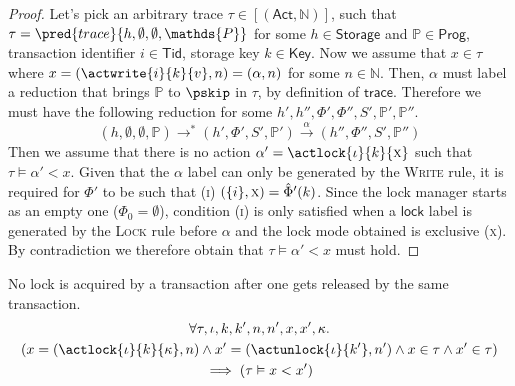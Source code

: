 \begin{proof}
Let's pick an arbitrary trace $\tau \in [(\mathsf{Act}, \mathds{N})]$, such that $\tau = \pred{trace}{h, \emptyset, \emptyset, \mathds{P}}$ for some $h \in \mathsf{Storage}$ and $\mathds{P} \in \mathsf{Prog}$, transaction identifier $i \in \mathsf{Tid}$, storage key $k \in \mathsf{Key}$. Now we assume that  $x \in \tau$ where $x = (\actwrite{i}{k}{v}, n) = (\alpha, n)$ for some $n \in \mathds{N}$. Then, $\alpha$ must label a reduction that brings $\mathds{P}$ to $\pskip$ in $\tau$, by definition of $\mathsf{trace}$. Therefore we must have the following reduction for some $h', h'', \Phi', \Phi'', S', \mathds{P}', \mathds{P}''$.
\[
(h, \emptyset, \emptyset, \mathds{P}) \rightarrow^* (h', \Phi', S', \mathds{P}') \xrightarrow{\alpha} (h'', \Phi'', S', \mathds{P}'')
\]
Then we assume that there is no action $\alpha' = \actlock{\iota}{k}{\textsc{x}}$ such that $\tau \vDash \alpha' < x$. Given that the $\alpha$ label can only be generated by the \textsc{Write} rule, it is required for $\Phi'$ to be such that (\textsc{i}) $(\{i\}, \textsc{x}) = \hat{\Phi}'(k)$. Since the lock manager starts as an empty one ($\Phi_0 = \emptyset$), condition (\textsc{i}) is only satisfied when a $\mathsf{lock}$ label is generated by the \textsc{Lock} rule before $\alpha$ and the lock mode obtained is exclusive (\textsc{x}). By contradiction we therefore obtain that $\tau \vDash \alpha' < x$ must hold.
\end{proof}

\lem \label{lem:2phase} No lock is acquired by a transaction after one gets released by the same transaction.
\begin{gather*}
\forall \tau, \iota, k, k', n, n', x, x', \kappa \ldotp \\
\left( x = (\actlock{\iota}{k}{\kappa}, n) \land x' = (\actunlock{\iota}{k'}, n') \land x \in \tau \land x' \in \tau \right) \\
\implies \left( \tau \vDash x < x' \right)
\end{gather*}

